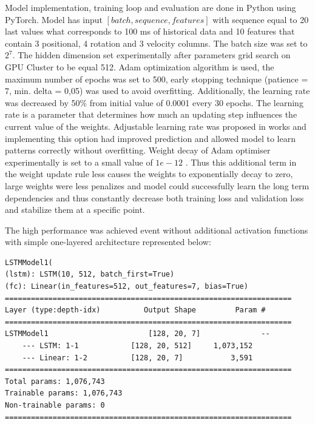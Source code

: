 Model implementation, training loop and evaluation are done in Python using PyTorch. Model has input $[batch, sequence, features]$ with sequence equal to 20 last values what corresponds to 100 ms of historical data and 10 features that contain 3 positional, 4 rotation and 3 velocity columns. The batch size was set to $2^{7}$. The hidden dimension set experimentally after parameters grid search on GPU Cluster to be equal 512. Adam optimization algorithm is used, the maximum number of epochs was set to 500, early stopping technique (patience = 7, min. delta = 0,05) was used to avoid overfitting. Additionally, the learning rate was decreased by 50\% from initial value of 0.0001 every 30 epochs. The learning rate is a parameter that determines how much an updating step influences the current value of the weights. Adjustable learning rate was proposed in works \cite{delay_compensation_360, telepresence} and implementing this option had improved prediction and allowed model to learn patterns correctly without overfitting. Weight decay of Adam optimiser experimentally is set to a small value of $1e-12$ . Thus this additional term in the weight update rule less causes the weights to exponentially decay to zero, large weights were less penalizes and model could successfully learn the long term dependencies and thus constantly decrease both training loss and validation loss  and stabilize them at a specific point. 

The high performance was achieved event without additional activation functions with simple one-layered architecture represented below:
\begin{lstlisting}[caption={One-layered LSTM with sliding window},captionpos=b]
LSTMModel1(
(lstm): LSTM(10, 512, batch_first=True)
(fc): Linear(in_features=512, out_features=7, bias=True)
==================================================================
Layer (type:depth-idx)          Output Shape         Param #
==================================================================
LSTMModel1                       [128, 20, 7]              --
	--- LSTM: 1-1            [128, 20, 512]     1,073,152
	--- Linear: 1-2          [128, 20, 7]           3,591
==================================================================
Total params: 1,076,743
Trainable params: 1,076,743
Non-trainable params: 0
==================================================================
\end{lstlisting}

